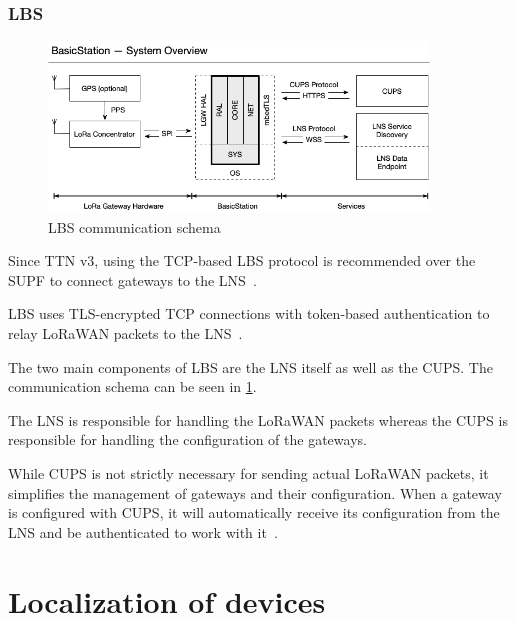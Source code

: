 \subsubsection{\acf{LBS}}

\begin{figure}
    \centering
    \includegraphics[width=0.9\textwidth]{pictures/lorawan-structure/lora-basics-station-structure.png}
    \caption{\acf{LBS} communication schema~\protect\cite{semtech_lora_developer_portal_lora_2022}}\label{pic:lora-basics-station-schema}
\end{figure}

Since \ac{TTN} v3, using the \ac{TCP}-based \acl{LBS} protocol is recommended over the \ac{SUPF} to connect gateways to the \ac{LNS}~\cite{the_things_industries_bv_semtech_2022}.

\ac{LBS} uses \ac{TLS}-encrypted \ac{TCP} connections with token-based authentication to relay \ac{LoRaWAN} packets to the \ac{LNS}~\cite{the_things_industries_bv_lora_2022}.

The two main components of \acl{LBS} are the \ac{LNS} itself as well as the \acf{CUPS}.
The communication schema can be seen in \cref{pic:lora-basics-station-schema}.

The \ac{LNS} is responsible for handling the \ac{LoRaWAN} packets whereas the \acl{CUPS} is responsible for handling the configuration of the gateways.

While \ac{CUPS} is not strictly necessary for sending actual \ac{LoRaWAN} packets, it simplifies the management of gateways and their configuration.
When a gateway is configured with \ac{CUPS}, it will automatically receive its configuration from the \ac{LNS} and be authenticated to work with it~\cite{the_things_industries_bv_lora_2022}.

\section{Localization of devices}

